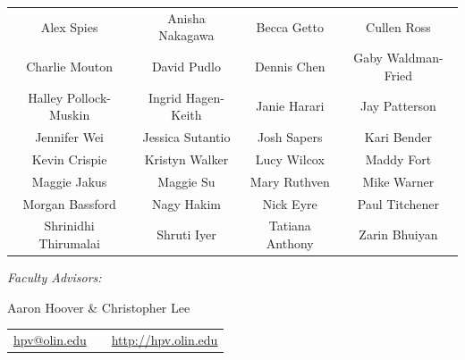 \begin{centering}
\vspace{-.05in}
\begin{center}
\begin{tabular}{c c c c}
Alex Spies &
Anisha Nakagawa &
Becca Getto &
Cullen Ross \\

Charlie Mouton &
David Pudlo &
Dennis Chen &
Gaby Waldman-Fried \\

Halley Pollock-Muskin &
Ingrid Hagen-Keith &
Janie Harari &
Jay Patterson \\

Jennifer Wei &
Jessica Sutantio  &
Josh Sapers &
Kari Bender \\

Kevin Crispie &
Kristyn Walker  &
Lucy Wilcox &
Maddy Fort \\

Maggie Jakus &
Maggie Su  &
Mary Ruthven &
Mike Warner \\

Morgan Bassford &
Nagy Hakim  &
Nick Eyre &
Paul Titchener \\

Shrinidhi Thirumalai  &
Shruti Iyer &
Tatiana Anthony &
Zarin Bhuiyan \\


\end{tabular}
\end{center}


\vspace{5pt}
{\it \large Faculty Advisors:}\par
\vspace{1pt}
{Aaron Hoover \& Christopher Lee}

\vspace{6pt}
\begin{center}
\begin{tabular}{c c c}
{\large \href{mailto:hpv@olin.edu}{hpv@olin.edu}} & &
{\large \href{http://hpv.olin.edu}{http://hpv.olin.edu}}
\end{tabular}
\end{center}

\end{centering}
\newpage

\ifxetex \setmainfont{Latin Modern Roman} \fi

